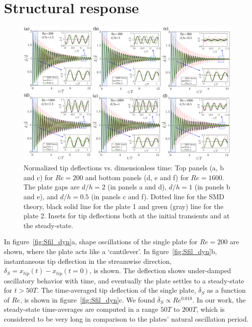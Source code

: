 \documentclass[aps,pre,twocolumn,aps,longbibliography]{revtex4-1}
\begin{document}
	
	\section{Structural response}
	
	
	
	\begin{figure}
		\begin{minipage}[c]{0.85\linewidth}
			\includegraphics[width=1\linewidth]{Fig07.pdf} 
		\end{minipage} 
		\caption{Normalized tip deflections vs. dimensionless time: Top panels (a, b and c) for $Re=200$ and bottom panels (d, e and f) for $Re=1600$. The plate gaps are $d/h=2$ (in panels a and d), $d/h=1$ (in panels b and e), and $d/h=0.5$ (in panels c and f). Dotted line for the SMD theory, black solid line for the plate 1 and green (gray) line for the plate 2. Insets for tip deflections both at the initial transients and at the steady-state.}
		\label{fig:transient_double_vs_Re}
	\end{figure} 
	
	In figure~\ref{fig:Sfil_dyn}a, shape oscillations of the single plate for $Re=200$ are shown, where the plate acts like a `cantilever'. In figure~\ref{fig:Sfil_dyn}b, instantaneous tip deflection in the streamwise direction, $\delta_S=x_{tip}(t)-x_{tip}(t=0)$, is shown. The deflection shows under-damped oscillatory behavior with time, and eventually the plate settles to a steady-state for $t>50T$. The time-averaged tip deflection of the single plate, $\overline{\delta}_S$ as a function of $Re$, is shown in figure~\ref{fig:Sfil_dyn}c. We found $\overline{\delta}_S\propto Re^{0.018}$. In our work, the steady-state time-averages are computed in a range $50T$ to $200T$, which is considered to be very long in comparison to the plates' natural oscillation period.
	
\end{document}
